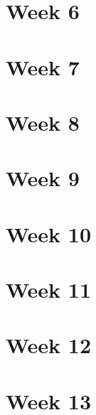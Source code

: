 \documentclass{article}
\begin{document}
\section{Week 6}

\section{Week 7}

\section{Week 8}

\section{Week 9}

\section{Week 10}

\section{Week 11}

\section{Week 12}

\section{Week 13}
\end{document}
